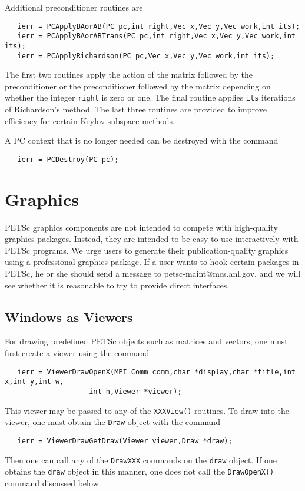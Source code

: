  
Additional preconditioner routines are
\begin{verbatim}
   ierr = PCApplyBAorAB(PC pc,int right,Vec x,Vec y,Vec work,int its);
   ierr = PCApplyBAorABTrans(PC pc,int right,Vec x,Vec y,Vec work,int its);
   ierr = PCApplyRichardson(PC pc,Vec x,Vec y,Vec work,int its);
\end{verbatim}
The first two routines apply the action of the matrix followed by the
preconditioner or the preconditioner followed by the matrix depending
on whether the  integer {\tt right} is
zero or one. The final routine applies {\tt its} iterations of
Richardson's method. The last three routines are provided to improve
efficiency for certain Krylov subspace methods.

A PC context that is no longer needed can be destroyed with the 
command 
\begin{verbatim}
   ierr = PCDestroy(PC pc);
\end{verbatim}

\chapter{Graphics}
\label{ch:graphics}


PETSc graphics components are not intended to compete with 
high-quality graphics packages.  Instead, they are intended to be 
easy to use interactively with PETSc programs. We urge users
to generate their publication-quality graphics using a
professional graphics package. If a user wants to hook
certain packages in PETSc, he or she should send a message to 
petsc-maint@mcs.anl.gov, and we will see whether it is reasonable
to try to provide direct interfaces.

\section{Windows as Viewers}
For drawing predefined PETSc objects such as matrices and vectors, one must 
first create a viewer using the 
command 
\begin{verbatim}
   ierr = ViewerDrawOpenX(MPI_Comm comm,char *display,char *title,int x,int y,int w,
                    int h,Viewer *viewer);
\end{verbatim}
This viewer may be passed to any of the {\tt XXXView()} routines.
To draw into the viewer, one must obtain the {\tt Draw} object with the
command 
\begin{verbatim}
   ierr = ViewerDrawGetDraw(Viewer viewer,Draw *draw);
\end{verbatim}
Then one can call any of the {\tt DrawXXX} commands on the {\tt draw}
object. If one obtains the {\tt draw} object in this manner, 
one does not call the {\tt DrawOpenX()} command discussed below.

